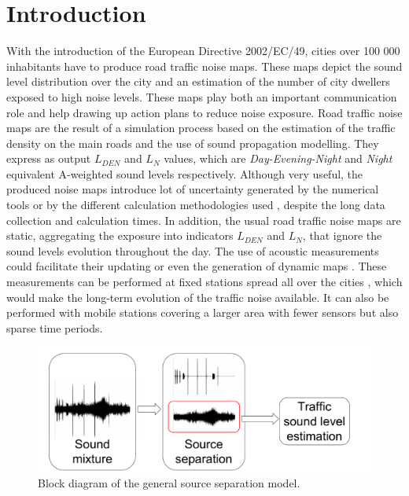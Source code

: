 \documentclass[twocolumn]{svjour3}          %
\begin{document}
\section{Introduction} \label{part:intro}

With the introduction of the European Directive 2002/\-EC/49, cities over 100 000 inhabitants have to produce road traffic noise maps. These maps depict the sound level distribution over the city and an estimation of the number of city dwellers exposed to high noise levels. These maps play both an important communication role and help drawing up action plans to reduce noise exposure. Road traffic noise maps are the result of a simulation process based on the estimation of the traffic density on the main roads and the use of sound propagation modelling. They express as output $L_ {DEN}$ and $L_N$ values, which are \textit{Day-Evening-Night} and \textit{Night} equivalent A-weighted sound levels respectively. Although very useful, the produced noise maps introduce lot of uncertainty generated by the numerical tools \cite{van_leeuwen_noise_2015} or by the different calculation methodologies used \cite{leroy_uncertainty_2010, garg_critical_2014}, despite the long data collection and calculation times. In addition, the usual road traffic noise maps are static, aggregating the exposure into indicators $L_{DEN}$ and $L_N$, that ignore the sound levels evolution throughout the day.
The use of acoustic measurements could facilitate their updating or even the generation of dynamic maps \cite{wei_dynamic_2016}. These measurements can be performed at fixed stations spread all over the cities \cite{Mioduszewski} \cite{mietlicki2012innovative}, which would make the long-term evolution of the traffic noise available. It can also be performed with  mobile stations \cite{can_exploring_2012} \cite{manvell2004sadmam} covering a larger area with fewer sensors but also sparse time periods.

\begin{figure}[t]
\centering
\includegraphics[width=\linewidth]{figures/bloc_diagram_source_separation.pdf}
\caption{Block diagram of the general source separation model.}
\label{fig:diagram}
\end{figure}
\end{document}
